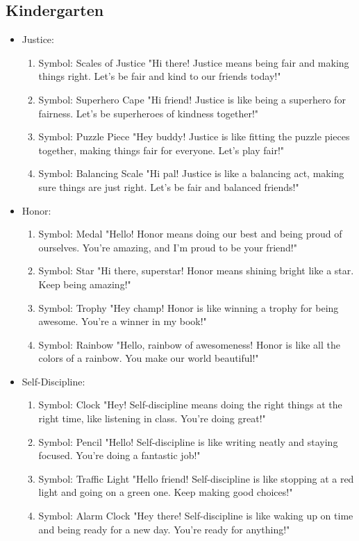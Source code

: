 \documentclass[11pt]{article}
\begin{document}
\subsection{Kindergarten}
\label{sec:org6979d80}
\begin{itemize}
\item Justice:
\begin{enumerate}
\item Symbol: Scales of Justice
"Hi there! Justice means being fair and making things right. Let's be fair and
kind to our friends today!"
\item Symbol: Superhero Cape
"Hi friend! Justice is like being a superhero for fairness. Let's be superheroes
of kindness together!"
\item Symbol: Puzzle Piece
"Hey buddy! Justice is like fitting the puzzle pieces together, making things fair
for everyone. Let's play fair!"
\item Symbol: Balancing Scale
"Hi pal! Justice is like a balancing act, making sure things are just right. Let's
be fair and balanced friends!"
\end{enumerate}
\item Honor:
\begin{enumerate}
\item Symbol: Medal
"Hello! Honor means doing our best and being proud of ourselves. You're amazing,
and I'm proud to be your friend!"
\item Symbol: Star
"Hi there, superstar! Honor means shining bright like a star. Keep being amazing!"
\item Symbol: Trophy
"Hey champ! Honor is like winning a trophy for being awesome. You're a winner in
my book!"
\item Symbol: Rainbow
"Hello, rainbow of awesomeness! Honor is like all the colors of a rainbow. You
make our world beautiful!"
\end{enumerate}
\item Self-Discipline:
\begin{enumerate}
\item Symbol: Clock
"Hey! Self-discipline means doing the right things at the right time, like
listening in class. You're doing great!"
\item Symbol: Pencil
"Hello! Self-discipline is like writing neatly and staying focused. You're doing a
fantastic job!"
\item Symbol: Traffic Light
"Hello friend! Self-discipline is like stopping at a red light and going on a
green one. Keep making good choices!"
\item Symbol: Alarm Clock
"Hey there! Self-discipline is like waking up on time and being ready for a new
day. You're ready for anything!"
\end{enumerate}
\end{itemize}
\end{document}
